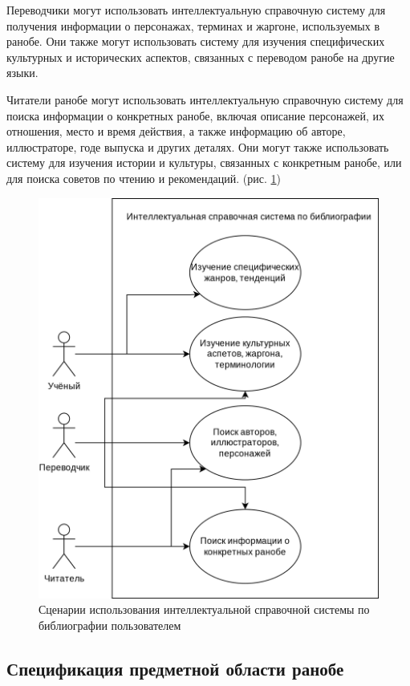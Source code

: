 Переводчики могут использовать интеллектуальную справочную систему для получения информации о персонажах, терминах и жаргоне, используемых в ранобе. Они также могут использовать систему для изучения специфических культурных и исторических аспектов, связанных с переводом ранобе на другие языки.

Читатели ранобе могут использовать интеллектуальную справочную систему для поиска информации о конкретных ранобе, включая описание персонажей, их отношения, место и время действия, а также информацию об авторе, иллюстраторе, годе выпуска и других деталях. Они могут также использовать систему для изучения истории и культуры, связанных с конкретным ранобе, или для поиска советов по чтению и рекомендаций. (рис. \ref{fig:usecases})

\begin{figure}[H]
    \centering
    \includegraphics[scale=0.2]{imgs/usecases.drawio.png}
    \caption{Сценарии использования интеллектуальной справочной системы по библиографии пользователем}
    \label{fig:usecases}
\end{figure}

\subsection{Спецификация предметной области ранобе}

